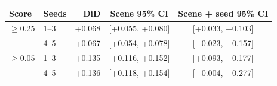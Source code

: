 \begin{tabular}{llrcc}
\toprule
Score & Seeds & DiD & Scene 95\% CI & Scene + seed 95\% CI \\
\midrule
$\geq 0.25$ & 1--3 & +0.068 & [+0.055, +0.080] & [+0.033, +0.103] \\
 & 4--5 & +0.067 & [+0.054, +0.078] & [$-$0.023, +0.157] \\
$\geq 0.05$ & 1--3 & +0.135 & [+0.116, +0.152] & [+0.093, +0.177] \\
 & 4--5 & +0.136 & [+0.118, +0.154] & [$-$0.004, +0.277] \\
\bottomrule
\end{tabular}
